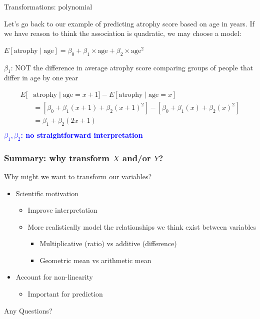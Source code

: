 \documentclass[10pt,t]{beamer}
\begin{document}
\begin{frame}{Transformations: polynomial}
	
	\vspace{-5 mm}
	
	Let's go back to our example of predicting atrophy score based on age in years. If we have reason to think the association is quadratic, we may choose a model:
	\medskip

\begin{center} $E[\text{atrophy} \mid \text{age}] = \beta_0 + \beta_1 \times \text{age} + \beta_2 \times \text{age}^2$ \end{center}
\bigskip

$\beta_1$: \color{red} NOT \color{black} the difference in average atrophy score comparing groups of people that differ in age by one year
\medskip

\begin{align*}
E[& \text{atrophy} \mid \text{age} = x + 1] -E[\text{atrophy} \mid \text{age} = x]\\
& = \left[\beta_0 + \beta_1 (x+1) + \beta_2(x+1)^2\right] -\left[\beta_0 + \beta_1 (x) + \beta_2(x)^2\right]\\
& = \beta_1 + \beta_2(2x+1) \\
\end{align*}\pause
\textbf{\textcolor{blue}{$\beta_1,\beta_2$: no straightforward interpretation}}
\end{frame}



\begin{frame}
\frametitle{Summary: why transform $X$ and/or $Y$?}
Why might we want to transform our variables? \vspace{0.3cm}
\begin{itemize}
	\item Scientific motivation
	\medskip
	\begin{itemize}
		\item Improve interpretation
		\medskip
		\item More realistically model the relationships we think exist between variables
		\medskip
		\begin{itemize}
			\item Multiplicative (ratio) vs additive (difference)
			\medskip
			\item Geometric mean vs arithmetic mean
		\end{itemize}
	\medskip
	\end{itemize}
	\item Account for non-linearity 
	\medskip
	\begin{itemize}
		\item Important for prediction
	\end{itemize}
\end{itemize}
\end{frame}

\begin{frame}[c]
\centering \huge Any Questions?
\end{frame}
\end{document}
